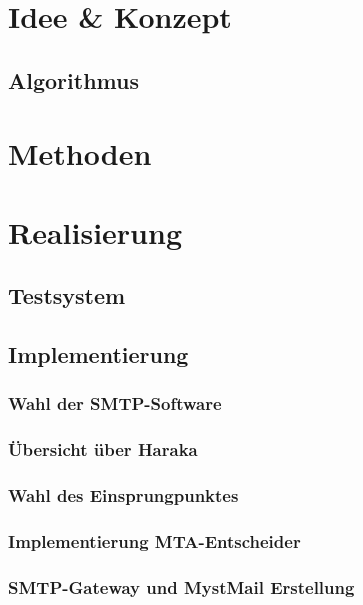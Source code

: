 \documentclass[	%
				a4paper, %
				onecolumn, %
				oneside, %
				titlepage, %
				openany, %
				12pt] %
				{report}
\begin{document}
	\section{Idee \& Konzept}
		
		\subsection{Algorithmus}
			
	\section{Methoden}
		
	\section{Realisierung}
			
		\subsection{Testsystem}
			
		\subsection{Implementierung}
			
			\subsubsection{Wahl der SMTP-Software}
				
			\subsubsection{Übersicht über Haraka}
				
			\subsubsection{Wahl des Einsprungpunktes}
								
	
			\subsubsection{Implementierung MTA-Entscheider}
				
			\subsubsection{SMTP-Gateway und MystMail Erstellung}
				
\end{document}
